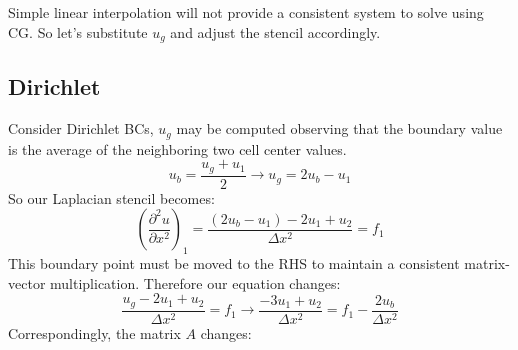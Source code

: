 \documentclass[landscape]{article}
\begin{document}
Simple linear interpolation will not provide a consistent system to solve using CG. So let's substitute $u_g$ and adjust the stencil accordingly.
\subsection{Dirichlet}
Consider Dirichlet BCs, $u_g$ may be computed observing that the boundary value is the average of the neighboring two cell center values.
\begin{equation}
    u_b = \frac{u_g + u_1}{2}
    \rightarrow
    u_g = 2u_b - u_1
\end{equation}
So our Laplacian stencil becomes:
\begin{equation}
   \left(\frac{\partial^2 u}{\partial x^2}\right)_{1} =
   \frac{(2 u_b - u_1) - 2 u_1 + u_{2}}{\Delta x^2} = f_1
\end{equation}
This boundary point must be moved to the RHS to maintain a consistent matrix-vector multiplication. Therefore our equation changes:
\begin{equation}
   \frac{u_g - 2 u_1 + u_{2}}{\Delta x^2} = f_1
   \rightarrow
   \frac{- 3 u_1 + u_{2}}{\Delta x^2} = f_1 - \frac{2 u_b}{\Delta x^2}
\end{equation}
Correspondingly, the matrix $A$ changes:
\end{document}
